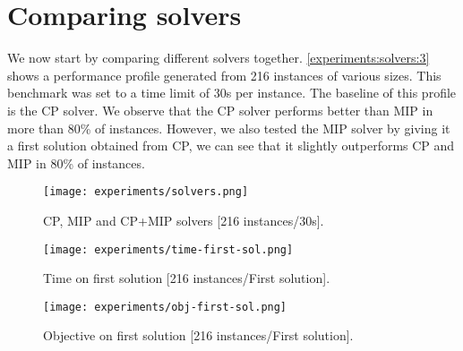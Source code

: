 \documentclass[../../thesis.tex]{subfiles}
\begin{document}
\section{Comparing solvers}

We now start by comparing different solvers together. \autoref{experiments:solvers:3} 
shows a performance profile generated from 216 instances of various sizes.
This benchmark was set to a time limit of 30s per instance. The baseline of this 
profile is the CP solver. We observe that the CP solver performs better than MIP in more than 80\% of instances.
However, we also tested the MIP solver by giving it a first solution obtained from CP, we can see that it slightly outperforms CP and MIP in 80\% of instances.

\begin{figure}
  \centering
  \texttt{[image: experiments/solvers.png]}
  \caption{CP, MIP and CP+MIP solvers [216 instances/30s].}
  \label{experiments:solvers:3}
\end{figure}


\begin{figure}
  \centering
  \texttt{[image: experiments/time-first-sol.png]}
  \caption{Time on first solution [216 instances/First solution].}
  \label{experiments:first-sol-time}
\end{figure}


\begin{figure}
  \centering
  \texttt{[image: experiments/obj-first-sol.png]}
  \caption{Objective on first solution [216 instances/First solution].}
  \label{experiments:first-sol-obj}
\end{figure}
\end{document}
